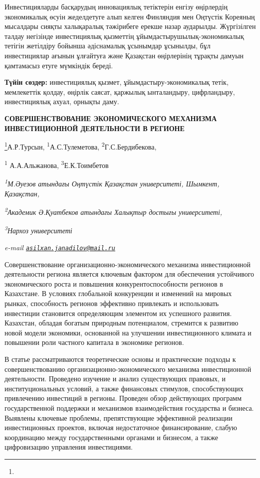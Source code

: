 Инвестицияларды басқарудың инновациялық тетіктерін енгізу өңірлердің
экономикалық өсуін жеделдетуге алып келген Финляндия мен Оңтүстік
Кореяның мысалдары сияқты халықаралық тәжірибеге ерекше назар аударылды.
Жүргізілген талдау негізінде инвестициялық қызметтің
ұйымдастырушылық-экономикалық тетігін жетілдіру бойынша әдіснамалық
ұсынымдар ұсынылды, бұл инвестициялар ағынын ұлғайтуға және Қазақстан
өңірлерінің тұрақты дамуын қамтамасыз етуге мүмкіндік береді.

{\bfseries Түйін сөздер:} инвестициялық қызмет, ұйымдастыру-экономикалық
тетік, мемлекеттік қолдау, өңірлік саясат, қаржылық ынталандыру,
цифрландыру, инвестициялық ахуал, орнықты даму.

{\bfseries СОВЕРШЕНСТВОВАНИЕ ЭКОНОМИЧЕСКОГО МЕХАНИЗМА ИНВЕСТИЦИОННОЙ
ДЕЯТЕЛЬНОСТИ В РЕГИОНЕ}

\footnote{}А.Р.Турсын\textsuperscript{\envelope },
\textsuperscript{1}А.С.Тулеметова, \textsuperscript{2}Г.С.Бердибекова,

\textsuperscript{1} А.А.Альжанова, \textsuperscript{3}Е.К.Тоимбетов

\emph{\textsuperscript{1}М.Әуезов атындағы Оңтүстік Қазақстан
университеті, Шымкент, Қазақстан,}

\emph{\textsuperscript{2}Академик Ә.Қуатбеков атындағы Халықтыр достығы
университеті,}

\emph{\textsuperscript{3}Нархоз университеті}

\emph{e-mail
\href{mailto:asilxan.janadilov@mail.ru}{\nolinkurl{asilxan.janadilov@mail.ru}}}

Совершенствование организационно-экономического механизма инвестиционной
деятельности региона является ключевым фактором для обеспечения
устойчивого экономического роста и повышения конкурентоспособности
регионов в Казахстане. В условиях глобальной конкуренции и изменений на
мировых рынках, способность регионов эффективно привлекать и
использовать инвестиции становится определяющим элементом их успешного
развития. Казахстан, обладая богатым природным потенциалом, стремится к
развитию новой модели экономики, основанной на улучшении инвестиционного
климата и повышении роли частного капитала в экономике регионов.

В статье рассматриваются теоретические основы и практические подходы к
совершенствованию организационно-экономического механизма инвестиционной
деятельности. Проведено изучение и анализ существующих правовых, и
институциональных условий, а также финансовых стимулов, способствующих
привлечению инвестиций в регионы. Проведен обзор действующих программ
государственной поддержки и механизмов взаимодействия государства и
бизнеса. Выявлены ключевые проблемы, препятствующие эффективной
реализации инвестиционных проектов, включая недостаточное
финансирование, слабую координацию между государственными органами и
бизнесом, а также цифровизацию управления инвестициями.


